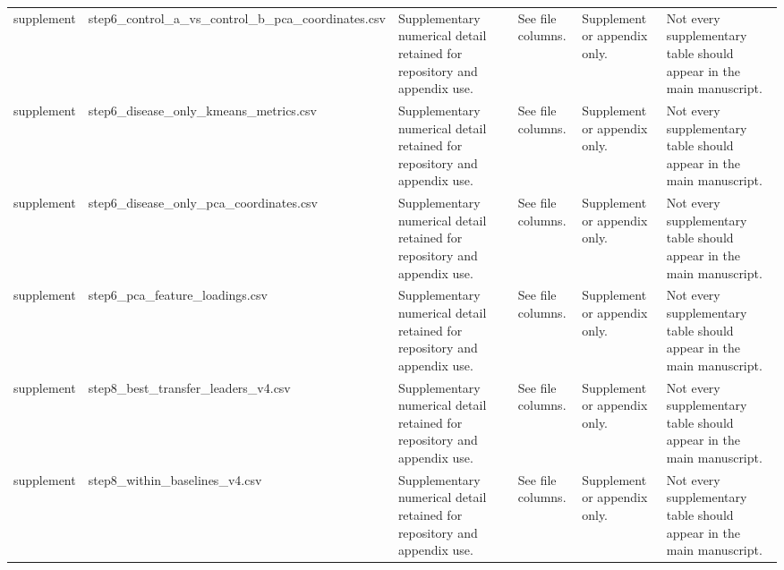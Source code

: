 \begin{longtable}{llllll}
supplement & step6_control_a_vs_control_b_pca_coordinates.csv & Supplementary numerical detail retained for repository and appendix use. & See file columns. & Supplement or appendix only. & Not every supplementary table should appear in the main manuscript. \\
supplement & step6_disease_only_kmeans_metrics.csv & Supplementary numerical detail retained for repository and appendix use. & See file columns. & Supplement or appendix only. & Not every supplementary table should appear in the main manuscript. \\
supplement & step6_disease_only_pca_coordinates.csv & Supplementary numerical detail retained for repository and appendix use. & See file columns. & Supplement or appendix only. & Not every supplementary table should appear in the main manuscript. \\
supplement & step6_pca_feature_loadings.csv & Supplementary numerical detail retained for repository and appendix use. & See file columns. & Supplement or appendix only. & Not every supplementary table should appear in the main manuscript. \\
supplement & step8_best_transfer_leaders_v4.csv & Supplementary numerical detail retained for repository and appendix use. & See file columns. & Supplement or appendix only. & Not every supplementary table should appear in the main manuscript. \\
supplement & step8_within_baselines_v4.csv & Supplementary numerical detail retained for repository and appendix use. & See file columns. & Supplement or appendix only. & Not every supplementary table should appear in the main manuscript. \\
\end{longtable}
